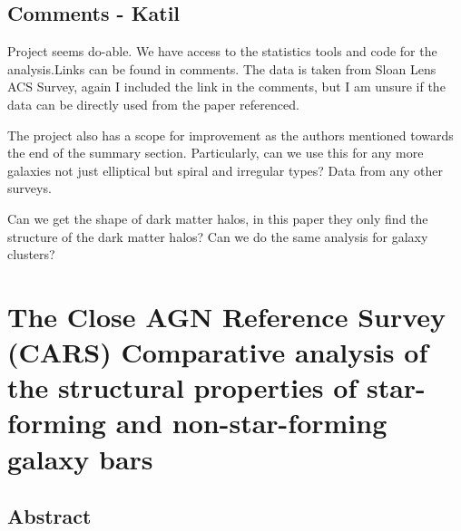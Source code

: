 \documentclass{article}
\begin{document}
\subsection{Comments - Katil}

Project seems do-able. We have access to the statistics tools and code for the analysis.Links can be found in comments. The data is taken from Sloan Lens ACS Survey, again I included the link in the comments, but I am unsure if the data can be directly used from the paper referenced.

The project also has a scope for improvement as the authors mentioned towards the end of the summary section. Particularly, can we use this for any more galaxies not just elliptical but spiral and irregular types? Data from any other surveys.

Can we get the shape of dark matter halos, in this paper they only find the structure of the dark matter halos? Can we do the same analysis for galaxy clusters?


\section{The Close AGN Reference Survey (CARS)
Comparative analysis of the structural properties of star-forming
and non-star-forming galaxy bars}

\subsection{Abstract}
\end{document}

